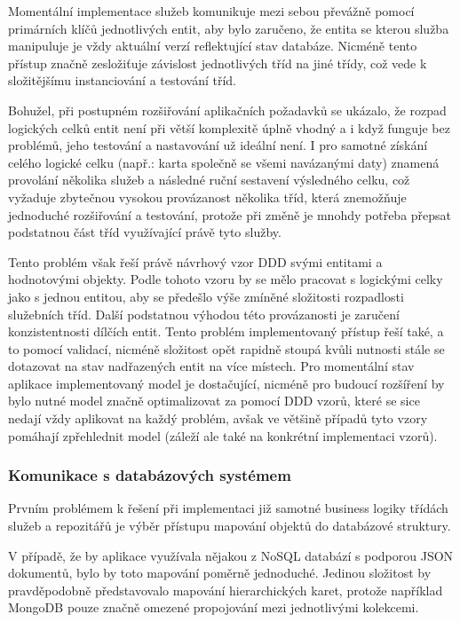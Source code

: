 		Momentální implementace služeb komunikuje mezi sebou převážně pomocí primárních klíčů jednotlivých entit, aby
		bylo zaručeno, že entita se kterou služba manipuluje je vždy aktuální verzí reflektující stav databáze.
		Nicméně tento přístup značně zesložiťuje závislost jednotlivých tříd na jiné třídy, což vede k složitějšímu
		instanciování a testování tříd.

		Bohužel, při postupném rozšiřování aplikačních požadavků se ukázalo, že rozpad logických celků entit není při větší
		komplexitě úplně vhodný a i když funguje bez problémů, jeho testování a nastavování už ideální není.
		I pro samotné získání celého logické celku (např.: karta společně se všemi navázanými daty) znamená provolání
		několika služeb a následné ruční sestavení výsledného celku, což vyžaduje zbytečnou vysokou provázanost několika tříd,
		která znemožňuje jednoduché rozšiřování a testování, protože při změně je mnohdy potřeba přepsat podstatnou část
		tříd využívající právě tyto služby.

		Tento problém však řeší právě návrhový vzor \ac{DDD} svými entitami a hodnotovými objekty.
		Podle tohoto vzoru by se mělo pracovat s logickými celky jako s jednou entitou, aby se předešlo výše zmíněné složitosti
		rozpadlosti služebních tříd.
		Další podstatnou výhodou této provázanosti je zaručení konzistentnosti dílčích entit.
		Tento problém implementovaný přístup řeší také, a to pomocí validací, nicméně složitost opět rapidně stoupá kvůli
		nutnosti stále se dotazovat na stav nadřazených entit na více místech.
		\cite{ddd_quickly}
		Pro momentální stav aplikace implementovaný model je dostačující, nicméně pro budoucí rozšíření by bylo nutné
		model značně optimalizovat za pomocí \ac{DDD} vzorů, které se sice nedají vždy aplikovat na každý problém, avšak
		ve většině případů tyto vzory pomáhají zpřehlednit model (záleží ale také na konkrétní implementaci vzorů).

		\subsubsection{Komunikace s databázových systémem}

		Prvním problémem k řešení při implementaci již samotné business logiky třídách služeb a repozitářů je výběr
		přístupu mapování objektů do databázové struktury.

		V případě, že by aplikace využívala nějakou z \ac{NoSQL} databází s podporou \ac{JSON} dokumentů, bylo by toto
		mapování poměrně jednoduché.
		Jedinou složitost by pravděpodobně představovalo mapování hierarchických karet, protože například MongoDB pouze
		značně omezené propojování mezi jednotlivými kolekcemi.

